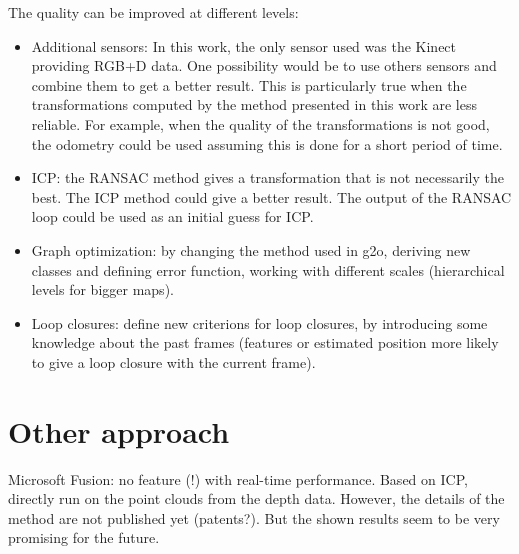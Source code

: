 The quality can be improved at different levels:
\begin{itemize}
\item Additional sensors: In this work, the only sensor used was the Kinect providing RGB+D data. One possibility would be to use others sensors and combine them to get a better result. This is particularly true when the transformations computed by the method presented in this work are less reliable. For example, when the quality of the transformations is not good, the odometry could be used assuming this is done for a short period of time.
\item ICP: the RANSAC method gives a transformation that is not necessarily the best. The ICP method could give a better result. The output of the RANSAC loop could be used as an initial guess for ICP.
\item Graph optimization: by changing the method used in g2o, deriving new classes and defining error function, working with different scales (hierarchical levels for bigger maps).
\item Loop closures: define new criterions for loop closures, by introducing some knowledge about the past frames (features or estimated position more likely to give a loop closure with the current frame).
\end{itemize}

\section{Other approach}

Microsoft Fusion: no feature (!) with real-time performance. Based on ICP, directly run on the point clouds from the depth data. However, the details of the method are not published yet (patents?). But the shown results seem to be very promising for the future.

